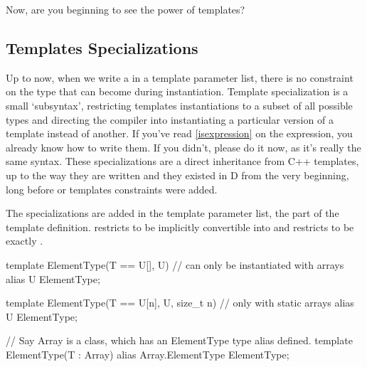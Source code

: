 Now, are you beginning to see the power of templates?



\subsection{Templates Specializations}\label{specializations}

Up to now, when we write a  in a template parameter list, there is no constraint on the type that  can become during instantiation. Template specialization is a small `subsyntax', restricting templates instantiations to a subset of all possible types and directing the compiler into instantiating a particular version of a template instead of another. If you've read \autoref{isexpression} on the  expression, you already know how to write them. If you didn't, please do it now, as it's really the same syntax. These specializations are a direct inheritance from C++ templates, up to the way they are written and they existed in D from the very beginning, long before  or templates constraints were added. 

The specializations are added in the template parameter list, the  part of the template definition.  restricts  to be implicitly convertible into  and  restricts  to be exactly . 

\begin{dcode}
template ElementType(T == U[], U) // can only be instantiated with arrays
{
    alias U ElementType;
}

template ElementType(T == U[n], U, size_t n) // only with static arrays
{
    alias U ElementType;
}

// Say Array is a class, which has an ElementType type alias defined.
template ElementType(T : Array) 
{
    alias Array.ElementType ElementType;
}
\end{dcode}

